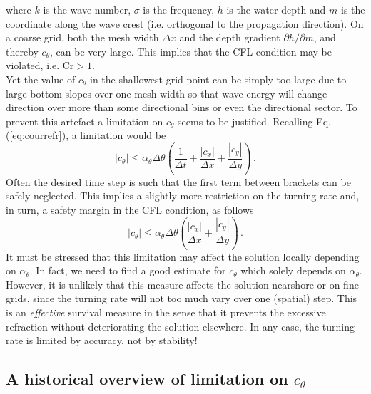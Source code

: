 \documentclass[12pt]{book}
\begin{document}
where $k$ is the wave number, $\sigma$ is the frequency, $h$ is the water depth and $m$ is the coordinate along the wave crest (i.e. orthogonal to the propagation direction). On a coarse grid, both the mesh width
$\Delta x$ and the depth gradient $\partial h/\partial m$, and thereby $c_\theta$, can be very large. This implies that the CFL condition may be violated, i.e. $\mbox{Cr} > 1$.
\\[2ex]
Yet the value of $c_\theta$ in the shallowest grid point can be simply too large due to large bottom slopes over one mesh width so that wave energy will change direction over more than some directional bins
or even the directional sector.
To prevent this artefact a limitation on $c_\theta$ seems to be justified. Recalling Eq. (\ref{eq:courrefr}), a limitation would be
\begin{equation}
  |c_\theta| \leq \alpha_\theta \Delta \theta \left ( \frac{1}{\Delta t} + \frac{|c_x|}{\Delta x} + \frac{|c_y|}{\Delta y} \right ) \, .
\end{equation}
Often the desired time step is such that the first term between brackets can be safely neglected. This implies a slightly more restriction on the turning rate and, in turn, a safety margin
in the CFL condition, as follows
\begin{equation}
  |c_\theta| \leq \alpha_\theta \Delta \theta \left ( \frac{|c_x|}{\Delta x} + \frac{|c_y|}{\Delta y} \right ) \, .
  \label{eq:cfllim}
\end{equation}
It must be stressed that this limitation may affect the solution locally depending on $\alpha_\theta$.
In fact, we need to find a good estimate for $c_\theta$ which solely depends on $\alpha_\theta$.
However, it is unlikely that this measure affects the solution nearshore or on fine grids, since the turning rate will not too much vary over one (spatial) step.
This is an {\em effective} survival measure in the sense that it prevents the excessive refraction without deteriorating the solution
elsewhere. In any case, the turning rate is limited by accuracy, not by stability!

\subsection{A historical overview of limitation on $c_\theta$}
\label{sec:hist}
\end{document}
